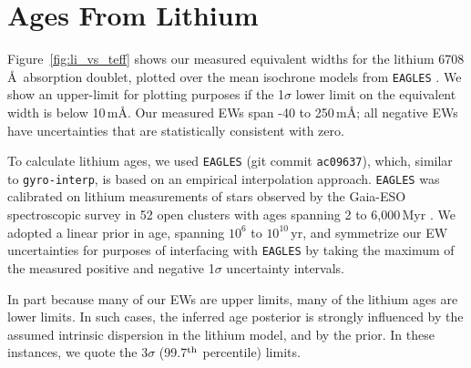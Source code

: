 \documentclass[11pt,twocolumn,tighten,linenumbers,trackchanges]{aastex63}
\begin{document}
\section{Ages From Lithium}
\label{sec:liage} 

Figure~\ref{fig:li_vs_teff} shows our measured equivalent widths for
the lithium 6708\,\AA\ absorption doublet, plotted over the mean
isochrone models from \texttt{EAGLES} \citep{Jeffries_2023}.  We
show an upper-limit for plotting purposes if the 1$\sigma$ lower
limit on the equivalent width is below 10\,m\AA.  Our measured EWs
span -40 to 250\,m\AA; all negative EWs have uncertainties that are
statistically consistent with zero.

To calculate lithium ages, we used \texttt{EAGLES} (git commit
\texttt{ac09637}), which, similar to \texttt{gyro-interp}, is based on
an empirical interpolation approach.  \texttt{EAGLES} 
was calibrated on lithium measurements of stars observed by the
Gaia-ESO spectroscopic survey in 52 open clusters with ages spanning 2
to 6{,}000\,Myr \citep{Jeffries_2023}.  We adopted a linear prior in
age, spanning $10^6$ to $10^{10}$\,yr, and symmetrize our EW
uncertainties for purposes of interfacing with \texttt{EAGLES} by
taking the maximum of the measured positive and negative 1$\sigma$
uncertainty intervals.

In part because many of our EWs are upper limits, many of the lithium
ages are lower limits.  In such cases,  the inferred age posterior is
strongly influenced by the assumed intrinsic dispersion in
the lithium model, and by the prior.  In these instances, we
quote the 3$\sigma$ (99.7$^{\rm th}$ percentile) limits.
\end{document}
